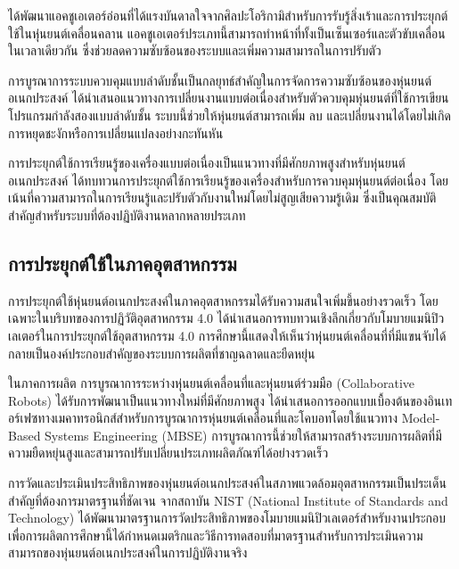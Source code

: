 \documentclass[a4paper]{article}
\begin{document}
\textcite{jin2021origami} ได้พัฒนาแอคชูเอเตอร์อ่อนที่ได้แรงบันดาลใจจากศิลปะโอริกามิสำหรับการรับรู้สิ่งเร้าและการประยุกต์ใช้ในหุ่นยนต์เคลื่อนคลาน แอคชูเอเตอร์ประเภทนี้สามารถทำหน้าที่ทั้งเป็นเซ็นเซอร์และตัวขับเคลื่อนในเวลาเดียวกัน ซึ่งช่วยลดความซับซ้อนของระบบและเพิ่มความสามารถในการปรับตัว

การบูรณาการระบบควบคุมแบบลำดับชั้นเป็นกลยุทธ์สำคัญในการจัดการความซับซ้อนของหุ่นยนต์อเนกประสงค์ \textcite{ieee2019continuous} ได้นำเสนอแนวทางการเปลี่ยนงานแบบต่อเนื่องสำหรับตัวควบคุมหุ่นยนต์ที่ใช้การเขียนโปรแกรมกำลังสองแบบลำดับชั้น ระบบนี้ช่วยให้หุ่นยนต์สามารถเพิ่ม ลบ และเปลี่ยนงานได้โดยไม่เกิดการหยุดชะงักหรือการเปลี่ยนแปลงอย่างกะทันหัน

การประยุกต์ใช้การเรียนรู้ของเครื่องแบบต่อเนื่องเป็นแนวทางที่มีศักยภาพสูงสำหรับหุ่นยนต์อเนกประสงค์ \textcite{thuruthel2021survey} ได้ทบทวนการประยุกต์ใช้การเรียนรู้ของเครื่องสำหรับการควบคุมหุ่นยนต์ต่อเนื่อง โดยเน้นที่ความสามารถในการเรียนรู้และปรับตัวกับงานใหม่โดยไม่สูญเสียความรู้เดิม ซึ่งเป็นคุณสมบัติสำคัญสำหรับระบบที่ต้องปฏิบัติงานหลากหลายประเภท

\subsection{การประยุกต์ใช้ในภาคอุตสาหกรรม}

การประยุกต์ใช้หุ่นยนต์อเนกประสงค์ในภาคอุตสาหกรรมได้รับความสนใจเพิ่มขึ้นอย่างรวดเร็ว โดยเฉพาะในบริบทของการปฏิวัติอุตสาหกรรม 4.0 \textcite{mohammadi2023mobile} ได้นำเสนอการทบทวนเชิงลึกเกี่ยวกับโมบายแมนิปิวเลเตอร์ในการประยุกต์ใช้อุตสาหกรรม 4.0 การศึกษานี้แสดงให้เห็นว่าหุ่นยนต์เคลื่อนที่ที่มีแขนจับได้กลายเป็นองค์ประกอบสำคัญของระบบการผลิตที่ชาญฉลาดและยืดหยุ่น

ในภาคการผลิต การบูรณาการระหว่างหุ่นยนต์เคลื่อนที่และหุ่นยนต์ร่วมมือ (Collaborative Robots) ได้รับการพัฒนาเป็นแนวทางใหม่ที่มีศักยภาพสูง \textcite{vitolo2022mobile} ได้นำเสนอการออกแบบเบื้องต้นของอินเทอร์เฟซทางเมคาทรอนิกส์สำหรับการบูรณาการหุ่นยนต์เคลื่อนที่และโคบอทโดยใช้แนวทาง Model-Based Systems Engineering (MBSE) การบูรณาการนี้ช่วยให้สามารถสร้างระบบการผลิตที่มีความยืดหยุ่นสูงและสามารถปรับเปลี่ยนประเภทผลิตภัณฑ์ได้อย่างรวดเร็ว

การวัดและประเมินประสิทธิภาพของหุ่นยนต์อเนกประสงค์ในสภาพแวดล้อมอุตสาหกรรมเป็นประเด็นสำคัญที่ต้องการมาตรฐานที่ชัดเจน \textcite{bostelman2016mobile} จากสถาบัน NIST (National Institute of Standards and Technology) ได้พัฒนามาตรฐานการวัดประสิทธิภาพของโมบายแมนิปิวเลเตอร์สำหรับงานประกอบเพื่อการผลิตการศึกษานี้ได้กำหนดเมตริกและวิธีการทดสอบที่มาตรฐานสำหรับการประเมินความสามารถของหุ่นยนต์อเนกประสงค์ในการปฏิบัติงานจริง
\end{document}
